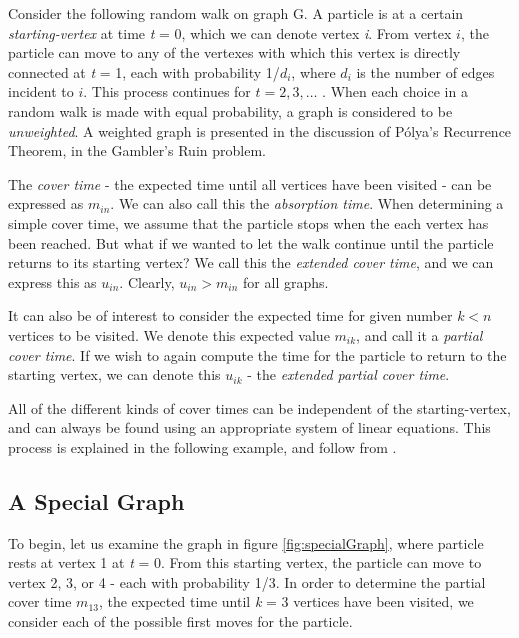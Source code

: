 \documentclass[11pt]{article}
\begin{document}
Consider the following random walk on graph G. A particle is at a certain \textit{starting-vertex} at time \textit{t}  = 0, which we can denote vertex  \textit{i}. From vertex $i$, the particle can move to any of the vertexes with which this vertex is directly connected at \textit{t}  = 1, each with probability 1/$d_i$, where $d_{i}$ is the number of edges incident to $i$. This process continues for $t = 2, 3, \ldots$ . When each choice in a random walk is made with equal probability, a graph is considered to be \textit{unweighted}. A weighted graph is presented in the discussion of Pólya's Recurrence Theorem, in the Gambler's Ruin problem.

The \textit{cover time} - the expected time until all vertices have been visited - can be expressed as $m_{in}$. We can also call this the \textit{absorption time}.  When determining a simple cover time, we assume that the particle stops when the each vertex has been reached. But what if we wanted to let the walk continue until the particle returns to its starting vertex? We call this the \textit{extended cover time}, and we can express this as \textit{$u_{in}$}. Clearly, \textit{$u_{in} > m_{in}$} for all graphs. 

It can also be of interest to consider the expected time for given number \textit{$k < n$} vertices to be visited. We denote this expected value \textit{$m_{ik}$}, and call it a \textit{partial cover time}. If we wish to again compute the time for the particle to return to the starting vertex, we can denote this \textit{$u_{ik}$} - the \textit{extended partial cover time}. 

All of the different kinds of cover times can be independent of the starting-vertex, and can always be found using an appropriate system of linear equations. This process is explained in the following example, and follow from \cite{BG}.

\subsection{A Special Graph}


\indent \indent To begin, let us examine the graph in figure \ref{fig:specialGraph}, where particle rests at vertex 1 at \textit{t}  = 0. From this starting vertex, the particle can move to vertex 2, 3, or 4 - each with probability 1/3. In order to determine the partial cover time \textit{$m_{13}$}, the expected time until \textit{k} = 3 vertices have been visited, we consider each of the possible first moves for the particle. 
\end{document}
